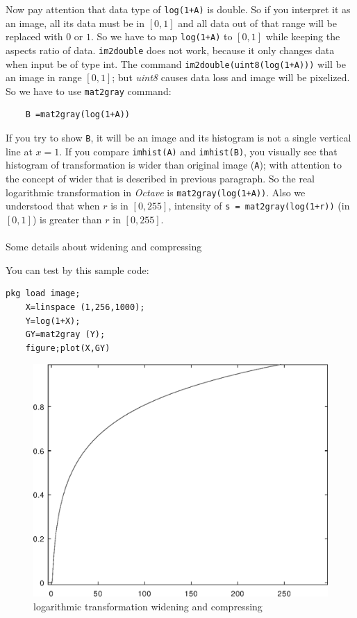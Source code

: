 Now pay attention that data type of \texttt{log(1+A)} is double. So if you
interpret it as an image, all its data must be in $[0,1]$ and all data out
of that range will be replaced with $0$ or $1$. So we have to map
\texttt{log(1+A)} to $[0,1]$ while keeping the aspects ratio of data.
\texttt{im2double} does not work, because it only changes data when input be
of type int. The command \texttt{im2double(uint8(log(1+A)))} will be an
image in range $[0,1]$; but \emph{uint8} causes data loss and image will be
pixelized. So we have to use \texttt{mat2gray} command: 
\begin{Verbatim}
    B =mat2gray(log(1+A))
\end{Verbatim}
If you try to show \texttt{B}, it will be an image and its histogram is not a
single vertical line at $x = 1$. If you compare \texttt{imhist(A)} and
\texttt{imhist(B)}, you visually see that histogram of transformation is wider
than original image (\texttt{A}); with attention to the concept of wider that is
described in previous paragraph. So the real logarithmic transformation in
\emph{Octave} is \texttt{mat2gray(log(1+A))}.
Also we understood that when $r$ is in $[0,255]$, intensity of \texttt{s = mat2gray(log(1+r))} (in $[0,1]$) is greater than 
$r$ in $[0,255]$. 


\paragraph{}Some details about widening and compressing

You can test by this sample code:

\begin{Verbatim}[frame=single,label=Octave lab:\ Logarithmic transformation ]
    pkg load image;
    X=linspace (1,256,1000);
    Y=log(1+X);
    GY=mat2gray (Y);
    figure;plot(X,GY)
\end{Verbatim}



\begin{figure}[htb!]
    \includegraphics[scale=0.4]{logarithmic_transformation_widening_and_compressing.eps}
    \centering
    \caption{logarithmic transformation widening and compressing}
    \label{fig:logarithmic_transformation_widening_and_compressing.eps}
\end{figure}
